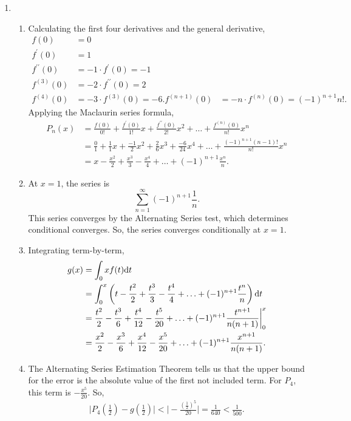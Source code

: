 \begin{enumerate}
	\item \begin{enumerate}
		\item Calculating the first four derivatives and the general derivative,
			\begin{align*}
				f(0) &= 0 \\
				f^\prime(0) &= 1 \\
				f^{\prime\prime}(0) &= -1\cdot f^\prime(0) = -1 \\
				f^{(3)}(0) &= -2\cdot f^{\prime\prime}(0) = 2 \\
				f^{(4)}(0) &= -3\cdot f^{(3)}(0) = -6.
				f^{(n+1)}(0) &= -n\cdot f^{(n)}(0) = (-1)^{n+1}n!.
			\end{align*}
			Applying the Maclaurin series formula,
			\begin{align*}
				P_n(x) &= \frac{f(0)}{0!} + \frac{f^\prime(0)}{1!}x + \frac{f^{\prime\prime}(0)}{2!}x^2 + \ldots + \frac{f^{(n)}(0)}{n!}x^n \\
				&= \frac{0}{1} + \frac{1}{1}x + \frac{-1}{2}x^2 + \frac{2}{6}x^3 + \frac{-6}{24}x^4 + \ldots + \frac{(-1)^{n+1}(n-1)!}{n!}x^n \\
				&= x - \frac{x^2}{2} + \frac{x^3}{3} - \frac{x^4}{4} + \ldots + (-1)^{n+1}\frac{x^n}{n}.
			\end{align*}
		\item At $x=1$, the series is
			\begin{equation*}
				\sum_{n=1}^{\infty}{(-1)^{n+1}\frac{1}{n}}.
			\end{equation*}
			This series converges by the Alternating Series test, which determines conditional converges.
			So, the series converges conditionally at $x=1$.
		\item Integrating term-by-term,
			\begin{align*}
				g(x) &= \int_{0}{x}{f(t)\mathrm{d} t} \\
				&= \int_{0}^{x}{\left(t-\frac{t^2}{2}+\frac{t^3}{3}-\frac{t^4}{4}+\ldots+(-1)^{n+1}\frac{t^n}{n}\right)\mathrm{d} t} \\
				&= \frac{t^2}{2} - \frac{t^3}{6} + \frac{t^4}{12} - \frac{t^5}{20} + \ldots + (-1)^{n+1}\frac{t^{n+1}}{n(n+1)} \biggr\rvert_{0}^{x} \\
				&= \frac{x^2}{2} - \frac{x^3}{6} + \frac{x^4}{12} - \frac{x^5}{20} + \ldots + (-1)^{n+1}\frac{x^{n+1}}{n(n+1)}.
			\end{align*}
		\item The Alternating Series Estimation Theorem tells us that the upper bound for the error is the absolute value of the first not included term.
			For $P_4$, this term is $-\frac{x^5}{20}$.
			So,
			\begin{align*}
				\biggr\lvert P_4\left(\frac{1}{2}\right) - g\left(\frac{1}{2}\right) \biggr\rvert < \biggr\lvert -\frac{\left(\frac{1}{2}\right)^5}{20} \biggr\rvert = \frac{1}{640} < \frac{1}{500}.
			\end{align*}
	\end{enumerate}

\end{enumerate}